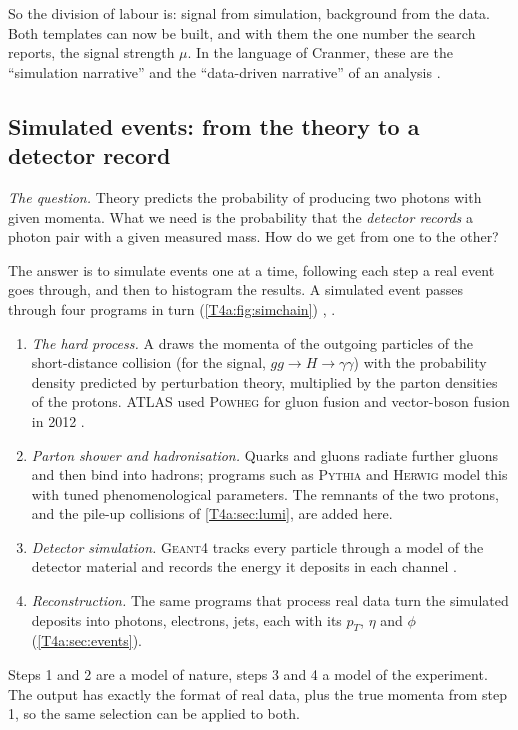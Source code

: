 So the division of labour is: signal from simulation, background from the data. Both templates can now be built, and with them the one number the search reports, the signal strength $\mu$. In the language of Cranmer, these are the ``simulation narrative'' and the ``data-driven narrative'' of an analysis \cite[Secs.~4.1--4.2]{Cranmer2015}.

\subsection{Simulated events: from the theory to a detector record}
\label{T4a:sec:simulation}

\emph{The question.} Theory predicts the probability of producing two photons with given momenta. What we need is the probability that the \emph{detector records} a photon pair with a given measured mass. How do we get from one to the other?

The answer is to simulate events one at a time, following each step a real event goes through, and then to histogram the results. A simulated event passes through four programs in turn (\cref{T4a:fig:simchain}) \cite[Sec.~4.1]{Cranmer2015}, \cite[Sec.~3]{AadHiggs2012}.
\begin{enumerate}[itemsep=1pt,leftmargin=1.5em]
  \item \emph{The hard process.} A  draws the momenta of the outgoing particles of the short-distance collision (for the signal, $gg\to H\to\gamma\gamma$) with the probability density predicted by perturbation theory, multiplied by the parton densities of the protons. ATLAS used \textsc{Powheg} for gluon fusion and vector-boson fusion in 2012 \cite[Table~1]{AadHiggs2012}.
  \item \emph{Parton shower and hadronisation.} Quarks and gluons radiate further gluons and then bind into hadrons; programs such as \textsc{Pythia} and \textsc{Herwig} model this with tuned phenomenological parameters. The remnants of the two protons, and the pile-up collisions of \cref{T4a:sec:lumi}, are added here.
  \item \emph{Detector simulation.} \textsc{Geant4} tracks every particle through a model of the detector material and records the energy it deposits in each channel \cite[Sec.~3]{AadHiggs2012}.
  \item \emph{Reconstruction.} The same programs that process real data turn the simulated deposits into photons, electrons, jets, each with its $p_T$, $\eta$ and $\phi$ (\cref{T4a:sec:events}).
\end{enumerate}
Steps 1 and 2 are a model of nature, steps 3 and 4 a model of the experiment. The output has exactly the format of real data, plus the true momenta from step 1, so the same selection can be applied to both.

